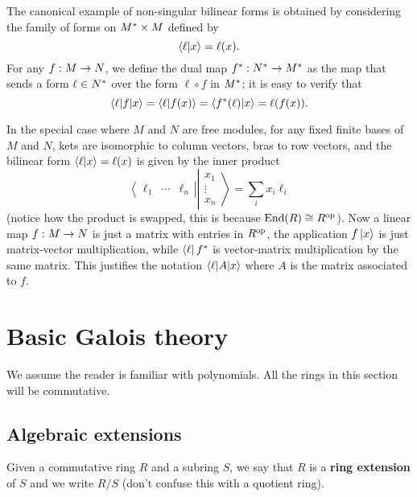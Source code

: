The canonical example of non-singular bilinear forms is obtained by
considering the family of forms on $M^\ast\times M$ defined by
\[\left\langle \ell \middle| x \right\rangle = \ell(x) \text{.}\]
For any $f:M\rightarrow N$, we define the dual map
$f^\ast:N^\ast\rightarrow M^\ast$ as the map that sends a form
$\ell\in N^\ast$ over the form $\ell\circ f$ in $M^\ast$; it is
easy to verify that
\[\left\langle \ell \middle| f \middle| x \right\rangle =  \left\langle \ell \middle| f(x) \right\rangle = \left\langle f^\ast(\ell) \middle| x \right\rangle
= \ell(f(x))\text{.}\]

In the special case where $M$ and $N$ are free modules, for any fixed
finite bases of $M$ and $N$, kets are isomorphic to column vectors,
bras to row vectors, and the bilinear form $\left\langle \ell \middle| x \right\rangle=\ell(x)$
is given by the inner product
\begin{equation*}
  \left\langle\begin{matrix}
      \ell_1 &\cdots & \ell_n
    \end{matrix}\right\rvert
  \left\lvert\begin{matrix}
    x_1\\
    \vdots\\
    x_n
  \end{matrix}\right\rangle
  =
  \sum_i x_i\ell_i
\end{equation*}
(notice how the product is swapped, this is because $\operatorname{End}(R)\cong
R^{\mathrm{op}}$).  Now a linear map $f:M\rightarrow N$ is just a matrix with entries in
$R^{\mathrm{op}}$, the application $f\left\lvert x \right\rangle$ is just matrix-vector
multiplication, while $\left\langle \ell \right\rvert f^\ast$ is vector-matrix
multiplication by the same matrix. This justifies the notation
$\left\langle \ell \middle| A \middle| x \right\rangle$ where $A$ is the matrix associated to $f$.


\section{Basic Galois theory}
\label{sec:basic-galois-theory}

We assume the reader is familiar with polynomials. All the rings in
this section will be commutative.

\subsection{Algebraic extensions}
\label{sec:basic-galois-theory:algebraic-extensions}
Given a commutative ring $R$ and a subring $S$, we say that $R$ is a
 \textbf{ring
  extension} of $S$ and we write $R/S$ (don't confuse this with a
quotient ring). 

